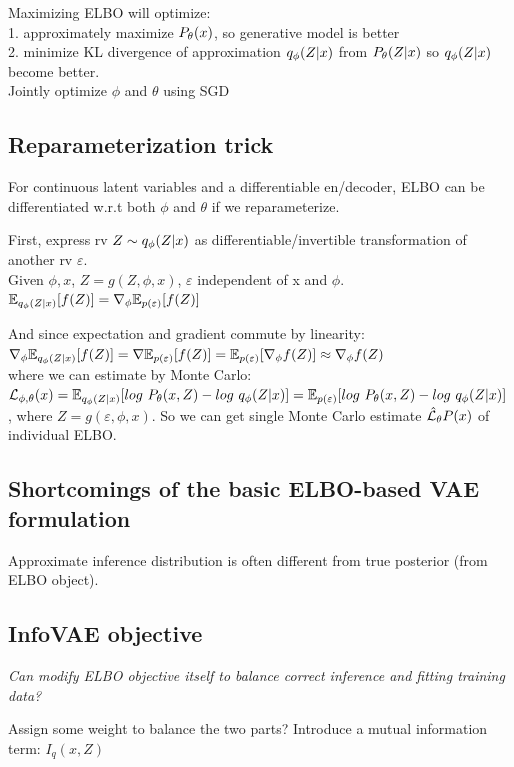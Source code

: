 \documentclass[12pt,a4paper]{article}
\begin{document}
\vspace{0.5cm}
Maximizing ELBO will optimize:\\
1. approximately maximize $P_\theta(x)$, so generative model is better \\
2. minimize KL divergence of approximation $q_\phi(Z|x)$ from $P_\theta(Z|x)$ so $q_\phi(Z|x)$ become better. \\
Jointly optimize $\phi$ and $\theta$ using SGD

\subsection{Reparameterization trick}
For continuous latent variables and a differentiable en/decoder, ELBO can be differentiated w.r.t both $\phi$ and $\theta$ if we reparameterize. 

First, express rv $Z\sim q_\phi(Z|x)$ as differentiable/invertible transformation of another rv $\varepsilon$.\\
Given $\phi, x$, $Z=g(Z, \phi, x)$, $\varepsilon$ independent of x and $\phi$. \\
$\mathbb{E}_{q_\phi(Z|x)}[f(Z)]=\nabla_\phi\mathbb{E}_{p(\varepsilon)}[f(Z)]$

And since expectation and gradient commute by linearity:\\
$\nabla_\phi\mathbb{E}_{q_\phi(Z|x)}[f(Z)]=\nabla \mathbb{E}_{p(\varepsilon)}[f(Z)]=\mathbb{E}_{p(\varepsilon)}[\nabla_\phi f(Z)] \approx \nabla_\phi f(Z)$\\
where we can estimate by Monte Carlo:\\
$\lossl_{\phi,\theta}(x)=\ee_{\qp(Z|x)}[log\ \pt(x,Z)-log\ \qp(Z|x)]=\ee_{p(\varepsilon)}[log\ \pt(x,Z)-log\ \qp(Z|x)]$, where $Z=g(\varepsilon,\phi,x)$. 
So we can get single Monte Carlo estimate $\hat{\mathcal{L}}_\theta P(x)$ of individual ELBO. 


\subsection{Shortcomings of the basic ELBO-based VAE formulation}
Approximate inference distribution is often different from true posterior (from ELBO object). 

\subsection{InfoVAE objective}
\textit{Can modify ELBO objective itself to balance correct inference and fitting training data? }

Assign some weight to balance the two parts? Introduce a mutual information term: $I_q (x,Z)$
\end{document}
